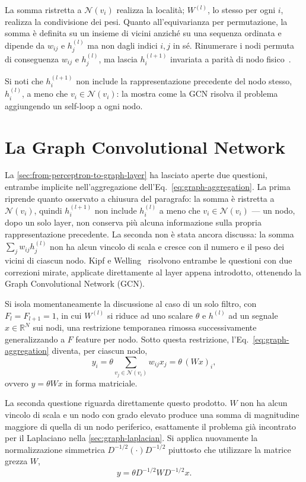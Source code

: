 La somma ristretta a $\mathcal{N}(v_i)$ realizza la località; $W^{(l)}$, lo stesso per ogni $i$, realizza la condivisione dei pesi. Quanto all'equivarianza per permutazione, la somma è definita su un insieme di vicini anziché su una sequenza ordinata e dipende da $w_{ij}$ e $h_j^{(l)}$ ma non dagli indici $i,j$ in sé. Rinumerare i nodi permuta di conseguenza $w_{ij}$ e $h_j^{(l)}$, ma lascia $h_i^{(l+1)}$ invariata a parità di nodo fisico~\cite{bronstein2021geometric}.

Si noti che $h_i^{(l+1)}$ non include la rappresentazione precedente del nodo stesso, $h_i^{(l)}$, a meno che $v_i \in \mathcal{N}(v_i)$: la  mostra come la GCN risolva il problema aggiungendo un self-loop a ogni nodo.

\section{La Graph Convolutional Network}
\label{sec:gcn-kipf-welling}

La \cref{sec:from-perceptron-to-graph-layer} ha lasciato aperte due questioni, entrambe implicite nell'aggregazione dell'Eq.~\eqref{eq:graph-aggregation}. La prima riprende quanto osservato a chiusura del paragrafo: la somma è ristretta a $\mathcal N(v_i)$, quindi $h_i^{(l+1)}$ non include $h_i^{(l)}$ a meno che $v_i\in\mathcal N(v_i)$ — un nodo, dopo un solo layer, non conserva più alcuna informazione sulla propria rappresentazione precedente. La seconda non è stata ancora discussa: la somma $\sum_j w_{ij}h_j^{(l)}$ non ha alcun vincolo di scala e cresce con il numero e il peso dei vicini di ciascun nodo. Kipf e Welling~\cite{kipf2017gcn} risolvono entrambe le questioni con due correzioni mirate, applicate direttamente al layer appena introdotto, ottenendo la Graph Convolutional Network (GCN).

Si isola momentaneamente la discussione al caso di un solo filtro, con $F_l=F_{l+1}=1$, in cui $W^{(l)}$ si riduce ad uno scalare $\theta$ e $h^{(l)}$ ad un segnale $x\in\mathbb{R}^N$ sui nodi, una restrizione temporanea rimossa successivamente generalizzando a $F$ feature per nodo. Sotto questa restrizione, l'Eq.~\eqref{eq:graph-aggregation} diventa, per ciascun nodo,
$$y_i = \theta\sum_{v_j\in\mathcal N(v_i)}w_{ij}x_j = \theta\,(Wx)_i,$$
ovvero $y=\theta Wx$ in forma matriciale.

La seconda questione riguarda direttamente questo prodotto. $W$ non ha alcun vincolo di scala e un nodo con grado elevato produce una somma di magnitudine maggiore di quella di un nodo periferico, esattamente il problema già incontrato per il Laplaciano nella \cref{sec:graph-laplacian}. Si applica nuovamente la normalizzazione simmetrica $D^{-1/2}(\cdot)D^{-1/2}$ piuttosto che utilizzare la matrice grezza $W$,
$$y = \theta D^{-1/2}WD^{-1/2}x.$$

